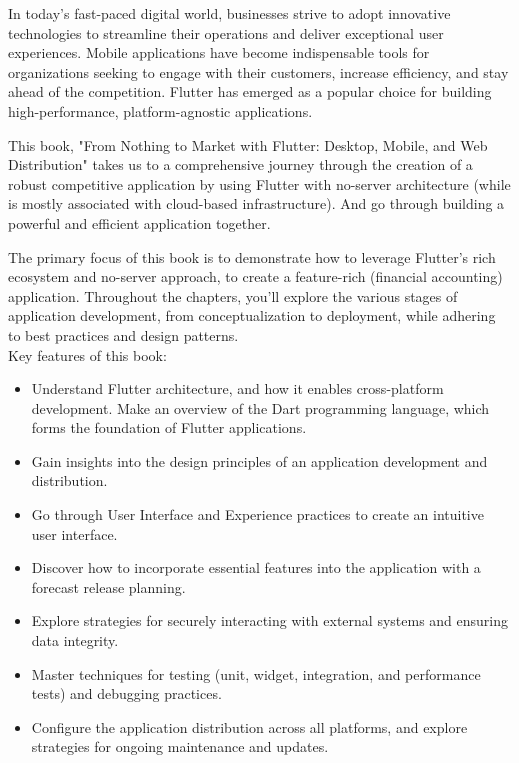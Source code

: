 

In today's fast-paced digital world, businesses strive to adopt innovative technologies to streamline their 
operations and deliver exceptional user experiences. Mobile applications have become indispensable tools 
for organizations seeking to engage with their customers, increase efficiency, and stay ahead of the competition. 
Flutter has emerged as a popular choice for building 
high-performance, platform-agnostic applications.

This book, "From Nothing to Market with Flutter: Desktop, Mobile, and Web Distribution" takes us to a comprehensive 
journey through the creation of a robust competitive application by using Flutter with no-server architecture (while 
 is mostly associated with cloud-based infrastructure). And go through building a powerful and efficient 
application together.

The primary focus of this book is to demonstrate how to leverage Flutter's rich ecosystem and no-server approach, 
to create a feature-rich (financial accounting) application. Throughout the chapters, you'll explore the various 
stages of application development, from conceptualization to deployment, while adhering to best practices and 
design patterns.
\\
\noindent Key features of this book:
\begin{itemize}
    \item Understand Flutter architecture, and how it enables cross-platform development. Make an overview of 
    the Dart programming language, which forms the foundation of Flutter applications.

    \item Gain insights into the design principles of an application development and distribution. 
    
    \item Go through User Interface and Experience practices to create an intuitive user interface.

    \item Discover how to incorporate essential features into the application with a forecast release planning.

    \item Explore strategies for securely interacting with external systems and ensuring data integrity.

    \item Master techniques for testing (unit, widget, integration, and performance tests) and debugging practices. 

    \item Configure the application distribution across all platforms, and explore strategies for ongoing 
    maintenance and updates.
\end{itemize}